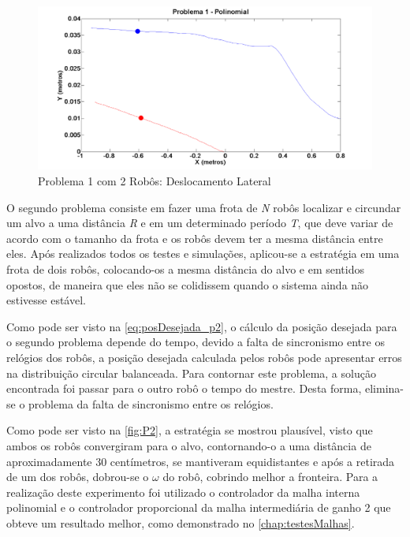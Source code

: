 \begin{figure}[!htb]
		\centering
		\includegraphics[width=.9\linewidth]{./Testes/Problema1/Incremental/P1Depois}
	\caption{Problema 1 com 2 Robôs: Deslocamento Lateral}
	\label{fig:sP13}
\end{figure}

O segundo problema consiste em fazer uma frota de \emph{N} robôs localizar e circundar um alvo a uma distância \emph{R} e em um determinado período \emph{T}, que deve variar de acordo com o tamanho da frota e os robôs devem ter a mesma distância entre eles. Após realizados todos os testes e simulações, aplicou-se a estratégia em uma frota de dois robôs, colocando-os a mesma distância do alvo e em sentidos opostos, de maneira que eles não se colidissem quando o sistema ainda não estivesse estável. 

Como pode ser visto na \autoref{eq:posDesejada_p2}, o cálculo da posição desejada para o segundo problema depende do tempo, devido a falta de sincronismo entre os relógios dos robôs, a posição desejada calculada pelos robôs pode apresentar erros na distribuição circular balanceada. Para contornar este problema, a solução encontrada foi passar para o outro robô o tempo do mestre. Desta forma, elimina-se o problema da falta de sincronismo entre os relógios. 

Como pode ser visto na \autoref{fig:P2}, a estratégia se mostrou plausível, visto que ambos os robôs convergiram para o alvo, contornando-o a uma distância de aproximadamente 30 centímetros, se mantiveram equidistantes e após a retirada de um dos robôs, %
dobrou-se o $\omega$ do robô, cobrindo melhor a fronteira. Para a realização deste experimento foi utilizado o controlador da malha interna polinomial e o controlador proporcional da malha intermediária de ganho 2 que obteve um resultado melhor, como demonstrado no \autoref{chap:testesMalhas}.

